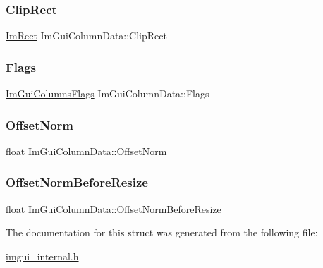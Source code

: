 \subsubsection{\texorpdfstring{Clip\+Rect}{ClipRect}}
{\footnotesize\ttfamily \mbox{\hyperlink{struct_im_rect}{Im\+Rect}} Im\+Gui\+Column\+Data\+::\+Clip\+Rect}

\mbox{\label{struct_im_gui_column_data_ab683ea097b8c60f143dc3c31818fa8d8}} 
\subsubsection{\texorpdfstring{Flags}{Flags}}
{\footnotesize\ttfamily \mbox{\hyperlink{imgui_8h_a0edb3053546fcf6c5f7dcb7531c3a17a}{Im\+Gui\+Columns\+Flags}} Im\+Gui\+Column\+Data\+::\+Flags}

\mbox{\label{struct_im_gui_column_data_a9678a00f55c9fa44ed35ec14ea9b697b}} 
\subsubsection{\texorpdfstring{Offset\+Norm}{OffsetNorm}}
{\footnotesize\ttfamily float Im\+Gui\+Column\+Data\+::\+Offset\+Norm}

\mbox{\label{struct_im_gui_column_data_aa97d00380db4a4b11ebc1f1f8ef72fc8}} 
\subsubsection{\texorpdfstring{Offset\+Norm\+Before\+Resize}{OffsetNormBeforeResize}}
{\footnotesize\ttfamily float Im\+Gui\+Column\+Data\+::\+Offset\+Norm\+Before\+Resize}



The documentation for this struct was generated from the following file\+:\begin{DoxyCompactItemize}
\item 
\mbox{\hyperlink{imgui__internal_8h}{imgui\+\_\+internal.\+h}}\end{DoxyCompactItemize}
